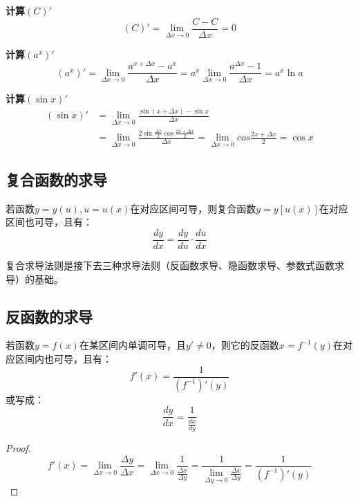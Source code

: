 {\bf 计算$\left( C \right) '$}
\[
\left( C \right) '=\underset{\Delta x\rightarrow 0}{\lim}\frac{C-C}{\Delta x}=0
\]

{\bf 计算$\left( a^x \right) '$}
\[
\left( a^x \right) '=\underset{\Delta x\rightarrow 0}{\lim}\frac{a^{x+\Delta x}-a^x}{\Delta x}=a^x\underset{\Delta x\rightarrow 0}{\lim}\frac{a^{\Delta x}-1}{\Delta x}=a^x\ln a
\]

{\bf 计算$\left( \sin x \right) '$}
\begin{align*}
\left( \sin x \right) '&=\underset{\Delta x\rightarrow 0}{\lim}\frac{\sin \left( x+\Delta x \right) -\sin x}{\Delta x} \\
&=\underset{\Delta x\rightarrow 0}{\lim}\frac{2\sin \frac{\Delta x}{2}\cos \frac{2x+\Delta x}{2}}{\Delta x}=\underset{\Delta x\rightarrow 0}{\lim}cos \frac{2x+\Delta x}{2}=\cos x
\end{align*}

\subsection{复合函数的求导}

\begin{theorem}[复合函数求导定理]
若函数$y=y\left( u \right) ,u=u\left( x \right) $在对应区间可导，则复合函数$y=y\left[ u\left( x \right) \right] $在对应区间也可导，且有：
\[
\frac{dy}{dx}=\frac{dy}{du}\cdot \frac{du}{dx}
\]
\end{theorem}

复合求导法则是接下去三种求导法则（反函数求导、隐函数求导、参数式函数求导）的基础。

\subsection{反函数的求导}

\begin{theorem}[反函数求导定理]
若函数$y=f\left( x \right) $在某区间内单调可导，且$y'\ne 0$，则它的反函数$x=f^{-1}\left( y \right) $在对应区间内也可导，且有：
\[
f'\left( x \right) =\frac{1}{\left( f^{-1} \right) '\left( y \right)}
\]
或写成：
\[
\frac{dy}{dx}=\frac{1}{\frac{dx}{dy}}
\]
\end{theorem}

\begin{proof}
\[
f'\left( x \right) =\underset{\Delta x\rightarrow 0}{\lim}\frac{\Delta y}{\Delta x}=\underset{\Delta x\rightarrow 0}{\lim}\frac{1}{\frac{\Delta x}{\Delta y}}=\frac{1}{\underset{\Delta y\rightarrow 0}{\lim}\frac{\Delta x}{\Delta y}}=\frac{1}{\left( f^{-1} \right) '\left( y \right)}
\]
\end{proof}

